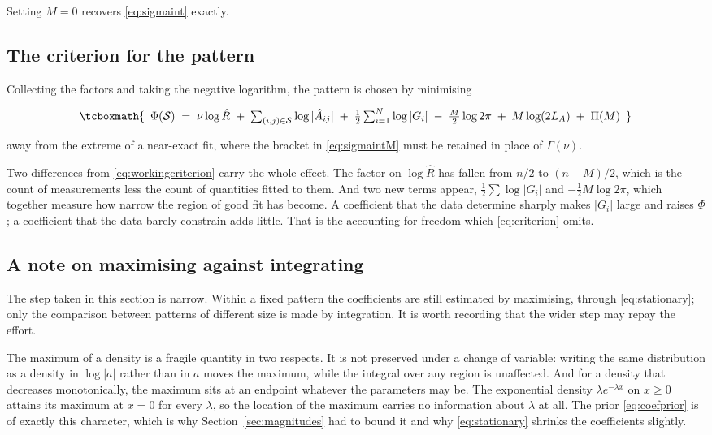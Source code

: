Setting $M = 0$ recovers \eqref{eq:sigmaint} exactly.

\subsection{The criterion for the pattern}

Collecting the factors and taking the negative logarithm, the pattern is chosen by
minimising



\begin{equation}
\tcboxmath{ \begin{array}[t]{c}
\Phi(\mathcal{S}) \;=\;
\nu \log \hat{R}
\;+\; \sum_{(i,j) \in \mathcal{S}} \log |\hat{A}_{ij}|
\;+\; \tfrac{1}{2} \sum_{i=1}^{N} \log \left| G_{i} \right|
\;-\; \frac{M}{2} \log 2\pi
\;+\; M \log (2 L_{A})
\;+\; \Pi(M)
\end{array}}
\label{eq:patterncriterion}
\end{equation}


away from the extreme of a near-exact fit, where the bracket in \eqref{eq:sigmaintM}
must be retained in place of $\Gamma(\nu)$.

Two differences from \eqref{eq:workingcriterion} carry the whole effect. The factor
on $\log \hat{R}$ has fallen from $n/2$ to $(n-M)/2$, which is the count of
measurements less the count of quantities fitted to them. And two new terms appear,
$\tfrac{1}{2}\sum \log|G_{i}|$ and $-\tfrac{1}{2} M \log 2\pi$, which together measure
how narrow the region of good fit has become. A coefficient that the data determine
sharply makes $|G_{i}|$ large and raises $\Phi$; a coefficient that the data barely
constrain adds little. That is the accounting for freedom which \eqref{eq:criterion}
omits.

\subsection{A note on maximising against integrating}
\label{sec:integratenote}

The step taken in this section is narrow. Within a fixed pattern the coefficients are
still estimated by maximising, through \eqref{eq:stationary}; only the comparison
between patterns of different size is made by integration. It is worth recording that
the wider step may repay the effort.

The maximum of a density is a fragile quantity in two respects. It is not preserved
under a change of variable: writing the same distribution as a density in $\log|a|$
rather than in $a$ moves the maximum, while the integral over any region is
unaffected. And for a density that decreases monotonically, the maximum sits at an
endpoint whatever the parameters may be. The exponential density
$\lambda e^{-\lambda x}$ on $x \ge 0$ attains its maximum at $x = 0$ for every
$\lambda$, so the location of the maximum carries no information about $\lambda$ at
all. The prior \eqref{eq:coefprior} is of exactly this character, which is why
Section~\ref{sec:magnitudes} had to bound it and why \eqref{eq:stationary} shrinks the
coefficients slightly.

